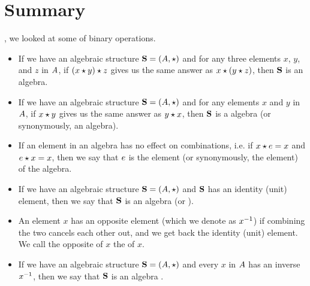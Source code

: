\documentclass[../../../main.tex]{subfiles}
\begin{document}
\section{Summary}

, we looked at some  of binary operations.

\begin{itemize}

  \item If we have an algebraic structure $\algebra{S} = (\set{A}, \opSymbol/)$ and for any three elements $x$, $y$, and $z$ in $A$, if $\op{(\op{x}{y})}{z}$ gives us the same answer as $\op{x}{(\op{y}{z})}$, then $\mathbf{S}$ is an  algebra.
  
  \item If we have an algebraic structure $\algebra{S} = (\set{A}, \opSymbol/)$ and for any elements $x$ and $y$ in $A$, if $\op{x}{y}$ gives us the same answer as $\op{y}{x}$, then $\mathbf{S}$ is a  algebra (or synonymously, an  algebra).
  
  \item If an element in an algebra has no effect on combinations, i.e. if $\op{x}{\unitEl/} = x$ and $\op{\unitEl/}{x} = x$, then we say that $\unitEl/$ is the  element (or synonymously, the  element) of the algebra.
  
  \item If we have an algebraic structure $\algebra{S} = (\set{A}, \opSymbol/)$ and $\mathbf{S}$ has an identity (unit) element, then we say that $\mathbf{S}$ is an algebra  (or ).
  
  \item An element $x$ has an opposite element (which we denote as $x^{-1}$) if combining the two cancels each other out, and we get back the identity (unit) element. We call the opposite of $x$ the  of $x$.
  
  \item If we have an algebraic structure $\algebra{S} = (\set{A}, \opSymbol/)$ and every $x$ in $A$ has an inverse $x^{-1}$, then we say that $\mathbf{S}$ is an algebra .
  
\end{itemize}
\end{document}
